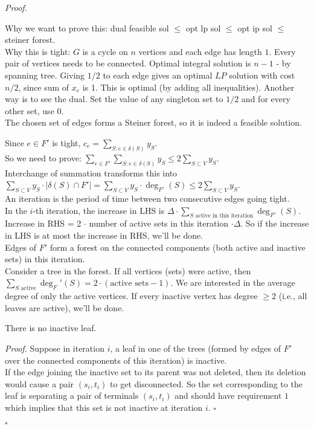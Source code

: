 \documentclass[a4paper]{article}
\newenvironment{proof}{\begin{breakbox}\textit{Proof.}}{\hfill$\square$\end{breakbox}}
\newcommand{\nl}{\vspace{0.2cm}\\}
\begin{document}
\begin{proof}
    \begin{note}
    Why we want to prove this: dual feasible sol $\le$ opt lp sol $\le$ opt ip sol $\le$ steiner forest.\nl
    Why this is tight: $G$ is a cycle on $n$ vertices and each edge has length $1$. Every pair of vertices needs to be connected. Optimal integral solution is $n - 1$ - by spanning tree. Giving
    $1/2$ to each edge gives an optimal $LP$ solution with cost $n/2$, since sum of $x_e$ is 1. This is optimal (by adding all inequalities). Another way is to see the dual. Set the value of any singleton set to $1/2$ and
    for every other set, use $0$.\nl
    The chosen set of edges forms a Steiner forest, so it is indeed a feasible solution.\nl
    \end{note}
    Since $e \in F'$ is tight, $c_e = \sum_{S : e \in \delta(S)} y_S$.\nl
    So we need to prove:
    $\sum_{e \in F'} \sum_{S : e \in \delta(S)} y_S \le 2 \sum_{S \subset V} y_S$.\nl
    Interchange of summation transforms this into
    $\sum_{S \subset V} y_S \cdot |\delta(S) \cap F'| = \sum_{S \subset V} y_S \cdot \deg_{F'}(S) \le 2 \sum_{S \subset V} y_S$.\nl
    An iteration is the period of time between two consecutive edges going tight.\nl
    In the $i$-th iteration, the increase in LHS is $\Delta \cdot \sum_{S \text{ active in this iteration}} \deg_{F'}(S)$.\nl
    Increase in RHS = 2 $\cdot$ number of active sets in this iteration $\cdot \Delta$. So if the increase in LHS is at most the increase in RHS, we'll be done.\nl
    Edges of $F'$ form a forest on the connected components (both active and inactive sets) in this iteration.\nl
    Consider a tree in the forest. If all vertices (sets) were active, then $\sum_{S \text{ active}} \deg_F'(S) = 2 \cdot (\text{active sets} - 1)$. We are interested in the average degree of only
    the active vertices. If every inactive vertex has degree $\ge 2$ (i.e., all leaves are active), we'll be done.\nl
    \begin{claim}
        There is no inactive leaf.
    \end{claim}
    \begin{proof}
        Suppose in iteration $i$, a leaf in one of the trees (formed by edges of $F'$ over the connected components of this iteration) is inactive.\nl
        If the edge joining the inactive set to its parent was not deleted, then its deletion would cause a pair $(s_i, t_i)$ to get disconnected. So the set corresponding to the leaf is
        separating a pair of terminals $(s_i, t_i)$ and should have requirement $1$ which implies that this set is not inactive at iteration $i$.
    \end{proof}
\end{proof}
\end{document}

